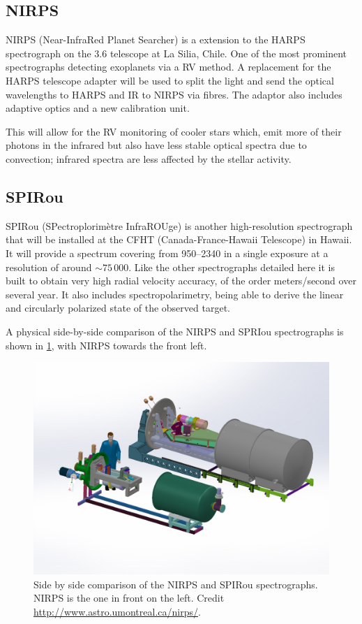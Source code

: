 \subsection{NIRPS}
\label{subsec:nirps}
{NIRPS} (Near-InfraRed Planet Searcher) is a \nir{} extension to the {HARPS} spectrograph on the 3.6\m{} telescope at La Silia, Chile.
One of the most prominent spectrographs detecting exoplanets via a RV method.
A replacement for the {HARPS} telescope adapter will be used to split the light and send the optical wavelengths to {HARPS} and {IR} to {NIRPS} via fibres.
The adaptor also includes adaptive optics and a new calibration unit.

This will allow for the RV monitoring of cooler stars which, emit more of their photons in the infrared but also have less stable optical spectra due to convection; infrared spectra are less affected by the stellar activity.

\subsection{SPIRou}
\label{subsec:spirou}
{SPIRou} (SPectroplorim\`etre InfraROUge) is another high-resolution \nir{} spectrograph that will be installed at the {CFHT} (Canada-France-Hawaii Telescope) in Hawaii.
It will provide a spectrum covering from 950--2340\nm{} in a single exposure at a resolution of around \(\sim75\,000\).
Like the other spectrographs detailed here it is built to obtain very high radial velocity accuracy, of the order meters/second over several year.
It also includes spectropolarimetry, being able to derive the linear and circularly polarized state of the observed target.

A physical side-by-side comparison of the {NIRPS} and {SPRIou} spectrographs is shown in \cref{fig:nirps-vs-spirou}, with {NIRPS} towards the front left.
\begin{figure}
    \centering
    \includegraphics[width=0.7\linewidth]{figures/spectroscopy/NIRPS-vs-SPIROU}
    \caption{Side by side comparison of the {NIRPS} and {SPIRou} spectrographs.
        {NIRPS} is the one in front on the left.
        Credit \href{http://www.astro.umontreal.ca/nirps/}{http://www.astro.umontreal.ca/nirps/}.}
    \label{fig:nirps-vs-spirou}
\end{figure}


